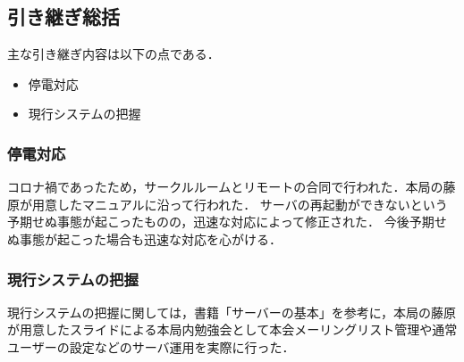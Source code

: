 \subsection*{引き継ぎ総括}


主な引き継ぎ内容は以下の点である．
\begin{itemize}
	\item 停電対応
	\item 現行システムの把握
\end{itemize}

\subsubsection*{停電対応}
コロナ禍であったため，サークルルームとリモートの合同で行われた．本局の藤原が用意したマニュアルに沿って行われた．
サーバの再起動ができないという予期せぬ事態が起こったものの，迅速な対応によって修正された．
今後予期せぬ事態が起こった場合も迅速な対応を心がける．

\subsubsection*{現行システムの把握}
現行システムの把握に関しては，書籍「サーバーの基本」を参考に，本局の藤原が用意したスライドによる本局内勉強会として本会メーリングリスト管理や通常ユーザーの設定などのサーバ運用を実際に行った．

